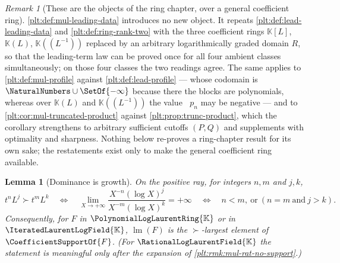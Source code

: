\documentclass[11pt,oneside]{article}
\theoremstyle{plain}
\newtheorem{lemma}[theorem]{Lemma}
\theoremstyle{definition}
\theoremstyle{remark}
\newtheorem{remark}[theorem]{Remark}
\newcommand{\K}{\mathbb{K}}
\newcommand{\PLlau}{\PolynomialLogLaurentRing{\K}}       %
\newcommand{\PLrat}{\RationalLogLaurentField{\K}}        %
\newcommand{\PLit}{\IteratedLaurentLogField{\K}}         %
\DeclareMathOperator{\lm}{lm}
\DeclareMathOperator{\degL}{deg_{L}}
\newcommand{\succdom}{\succ}
\begin{document}
\begin{remark}[These are the objects of the ring chapter, over a general
coefficient ring]
\label{plt:rmk:mul-leading-restated}
\cref{plt:def:mul-leading-data} introduces no new object.  It repeats
\cref{plt:def:lead-leading-data} and \cref{plt:def:ring-rank-two} with the
three coefficient rings $\K[L]$, $\K(L)$, $\K((L^{-1}))$ replaced by an
arbitrary logarithmically graded domain $R$, so that the leading-term law can
be proved once for all four ambient classes simultaneously; on those four
classes the two readings agree.  The same applies to
\cref{plt:def:mul-profile} against \cref{plt:def:lead-profile} --- whose
codomain is $\NaturalNumbers\cup\SetOf{-\infty}$ because there the blocks are
polynomials, whereas over $\K(L)$ and $\K((L^{-1}))$ the value $\degL p_n$ may
be negative --- and to \cref{plt:cor:mul-truncated-product} against
\cref{plt:prop:trunc-product}, which the corollary strengthens to arbitrary
sufficient cutoffs $(P,Q)$ and supplements with optimality and sharpness.
Nothing below re-proves a ring-chapter result for its own sake; the
restatements exist only to make the general coefficient ring available.
\end{remark}

\begin{lemma}[Dominance is growth]
\label{plt:lem:mul-dominance}
On the positive ray, for integers $n,m$ and $j,k$,
\[
 t^nL^j\succdom t^mL^k
 \quad\Longleftrightarrow\quad
 \lim_{X\to+\infty}\frac{X^{-n}(\log X)^j}{X^{-m}(\log X)^k}=+\infty
 \quad\Longleftrightarrow\quad
 n<m,\ \text{or}\ (n=m\ \text{and}\ j>k).
\]
Consequently, for $F$ in $\PLlau$ or in $\PLit$, $\lm(F)$ is the
$\succdom$-largest element of $\CoefficientSupportOf{F}$.  (For $\PLrat$ the
statement is meaningful only after the expansion of
\cref{plt:rmk:mul-rat-no-support}.)
\end{lemma}
\end{document}
